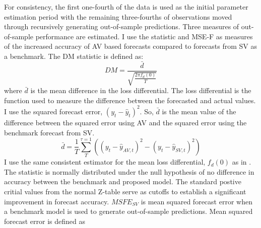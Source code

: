 For consistency, the first one-fourth of the data is used as the initial parameter estimation period with the remaining three-fourths of observations moved through recursively generating out-of-sample predictions. Three measures of out-of-sample performance are estimated.
I use the \citet{Diebold1995} statistic and \citet{mccracken_asymptotics_2007} MSE-F as measures of the increased accuracy of AV based forecasts compared to forecasts from SV as a benchmark. The DM statistic is defined as:
\begin{equation}
	DM = \frac{\bar{d}}{\sqrt{\frac{2\pi f_{d}(0)}{T}}}
\end{equation}
where $\bar{d}$ is the mean difference in the loss differential. The loss differential is the function used to measure the difference between the forecasted and actual values. I use the squared forecast error, $(y_{t} - \hat{y}_{t})^{2}$. So, $\bar{d}$ is the mean value of the difference between the squared error using AV and the squared error using the benchmark forecast from SV.
\begin{equation}
	\bar{d} = \frac{1}{T}\sum_{T}^{\tau=1}((y_{t} - \hat{y}_{AV,t})^{2} - (y_{t} - \hat{y}_{SV,t})^{2})
\end{equation}
I use the same consistent estimator for the mean loss differential, $f_{d}(0)$ as in \citet{Diebold1995}. The statistic is normally distributed under the null hypothesis of no difference in accuracy between the benchmark and proposed model. The standard postive critial values from the normal Z-table serve as cutoffs to establish a significant improvement in forecast accuracy. $MSFE_{SV}$ is mean squared forecast error when a benchmark model is used to generate out-of-sample predictions. Mean squared forecast error is defined as
